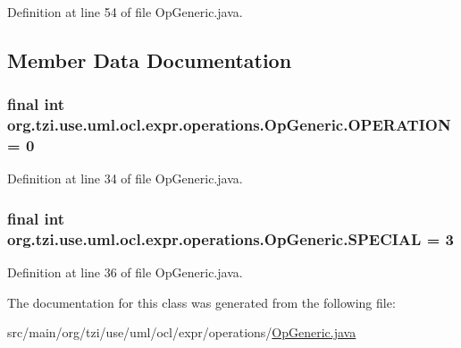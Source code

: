 Definition at line 54 of file Op\-Generic.\-java.



\subsection{Member Data Documentation}
\hypertarget{classorg_1_1tzi_1_1use_1_1uml_1_1ocl_1_1expr_1_1operations_1_1_op_generic_a6a5f036b56e41acf7fe556d9e1c988be}{
\subsubsection[{O\-P\-E\-R\-A\-T\-I\-O\-N}]{\setlength{\rightskip}{0pt plus 5cm}final int org.\-tzi.\-use.\-uml.\-ocl.\-expr.\-operations.\-Op\-Generic.\-O\-P\-E\-R\-A\-T\-I\-O\-N = 0\hspace{0.3cm}{\ttfamily [static]}}}\label{classorg_1_1tzi_1_1use_1_1uml_1_1ocl_1_1expr_1_1operations_1_1_op_generic_a6a5f036b56e41acf7fe556d9e1c988be}


Definition at line 34 of file Op\-Generic.\-java.

\hypertarget{classorg_1_1tzi_1_1use_1_1uml_1_1ocl_1_1expr_1_1operations_1_1_op_generic_a7a2ddd700331b8b06dc5482b7d288716}{
\subsubsection[{S\-P\-E\-C\-I\-A\-L}]{\setlength{\rightskip}{0pt plus 5cm}final int org.\-tzi.\-use.\-uml.\-ocl.\-expr.\-operations.\-Op\-Generic.\-S\-P\-E\-C\-I\-A\-L = 3\hspace{0.3cm}{\ttfamily [static]}}}\label{classorg_1_1tzi_1_1use_1_1uml_1_1ocl_1_1expr_1_1operations_1_1_op_generic_a7a2ddd700331b8b06dc5482b7d288716}


Definition at line 36 of file Op\-Generic.\-java.



The documentation for this class was generated from the following file\-:\begin{DoxyCompactItemize}
\item 
src/main/org/tzi/use/uml/ocl/expr/operations/\hyperlink{_op_generic_8java}{Op\-Generic.\-java}\end{DoxyCompactItemize}
